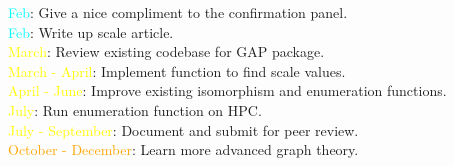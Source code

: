 \documentclass[preview]{standalone}
\begin{document}
\textcolor{cyan}{Feb}: Give a nice compliment to the confirmation panel.\\\textcolor{cyan}{Feb}: Write up scale article.\\\textcolor{yellow}{March}: Review existing codebase for GAP package.\\\textcolor{yellow}{March - April}: Implement function to find scale values.\\\textcolor{yellow}{April - June}: Improve existing isomorphism and enumeration functions.\\\textcolor{yellow}{July}: Run enumeration function on HPC.\\\textcolor{yellow}{July - September}: Document and submit for peer review.\\\textcolor{orange}{October - December}: Learn more advanced graph theory.\\
\end{document}
